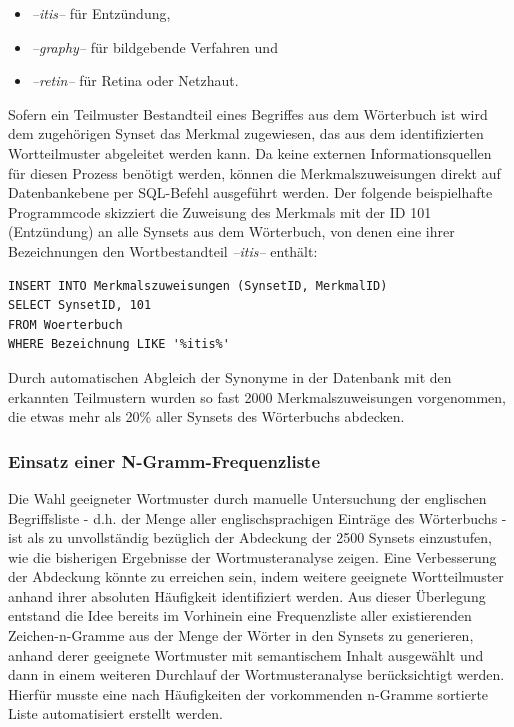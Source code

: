 \documentclass[pagesize,DIV=calc,12pt,draft]{scrreprt}
\begin{document}
\begin{itemize}
\item
 \emph{--itis--} für Entzündung,
\item
 \emph{--graphy--} für bildgebende Verfahren und
\item
 \emph{--retin--} für Retina oder Netzhaut.
\end{itemize}

Sofern ein Teilmuster Bestandteil eines Begriffes aus dem Wörterbuch ist wird dem zugehörigen Synset das Merkmal zugewiesen, das aus dem identifizierten Wortteilmuster abgeleitet werden kann. 
Da keine externen Informationsquellen für diesen Prozess benötigt werden, können die Merkmalszuweisungen direkt auf Datenbankebene per SQL-Befehl ausgeführt werden. 
Der folgende beispielhafte Programmcode skizziert die Zuweisung des Merkmals mit der ID 101 (Entzündung) an alle Synsets aus dem Wörterbuch, von denen eine ihrer Bezeichnungen den Wortbestandteil \emph{--itis--} enthält: 

\begin{lstlisting}
INSERT INTO Merkmalszuweisungen (SynsetID, MerkmalID) 
SELECT SynsetID, 101 
FROM Woerterbuch 
WHERE Bezeichnung LIKE '%itis%'
\end{lstlisting}

Durch automatischen Abgleich der Synonyme in der Datenbank mit den erkannten Teilmustern wurden so fast 2000 Merkmalszuweisungen vorgenommen, die etwas mehr als 20\% aller Synsets des Wörterbuchs abdecken. 

\subsubsection{Einsatz einer N-Gramm-Frequenzliste}

Die Wahl geeigneter Wortmuster durch manuelle Untersuchung der englischen Begriffsliste - d.h. der Menge aller englischsprachigen Einträge des Wörterbuchs - ist als zu unvollständig bezüglich der Abdeckung der 2500 Synsets einzustufen, wie die bisherigen Ergebnisse der Wortmusteranalyse zeigen. 
Eine Verbesserung der Abdeckung könnte zu erreichen sein, indem weitere geeignete Wortteilmuster anhand ihrer absoluten Häufigkeit identifiziert werden. 
Aus dieser Überlegung entstand die Idee bereits im Vorhinein eine Frequenzliste aller existierenden Zeichen-n-Gramme aus der Menge der Wörter in den Synsets zu generieren, anhand derer geeignete Wortmuster mit semantischem Inhalt ausgewählt und dann in einem weiteren Durchlauf der Wortmusteranalyse berücksichtigt werden. 
Hierfür musste eine nach Häufigkeiten der vorkommenden n-Gramme sortierte Liste automatisiert erstellt werden. 
\end{document}
